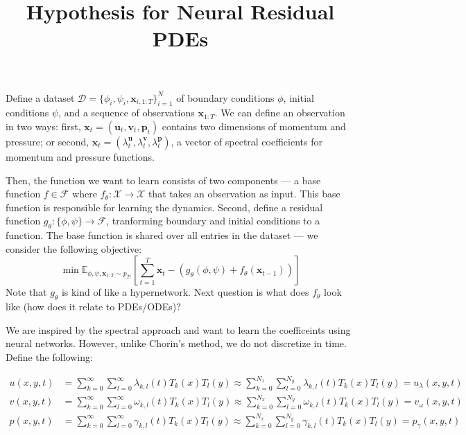 \documentclass[12pt]{article}
\begin{document}
\title{Hypothesis for Neural Residual PDEs}
\maketitle

\noindent Define a dataset $\mathcal{D} = \{ \phi_i, \psi_i, \mathbf{x}_{i, 1:T} \}_{i=1}^N$ of boundary conditions $\phi$, initial conditions $\psi$, and a sequence of observations $\mathbf{x}_{1:T}$. We can define an observation in two ways: first, $\mathbf{x}_t = (\mathbf{u}_t, \mathbf{v}_t, \mathbf{p}_t)$ contains two dimensions of momentum and pressure; or second, $\mathbf{x}_t = (\lambda_t^{\mathbf{u}}, \lambda_t^{\mathbf{v}}, \lambda_t^{\mathbf{p}})$, a vector of spectral coefficients for momentum and pressure functions.\newline

\noindent Then, the function we want to learn consists of two components --- a base function $f \in \mathcal{F}$ where $f_\theta: \mathcal{X} \rightarrow \mathcal{X}$ that takes an observation as input. This base function is responsible for learning the dynamics. Second, define a residual function $g_\theta: \{\phi, \psi\} \rightarrow \mathcal{F}$, tranforming boundary and initial conditions to a function. The base function is shared over all entries in the dataset --- we consider the following objective:
\begin{equation}
    \min \mathbb{E}_{\phi,\psi,\mathbf{x}_{1:T} \sim p_{\mathcal{D}}}\left[ \sum_{t=1}^T \mathbf{x}_t - (g_\theta(\phi,\psi) + f_\theta(\mathbf{x}_{t-1})) \right]
\end{equation}
\noindent Note that $g_\theta$ is kind of like a hypernetwork. Next question is what does $f_\theta$ look like (how does it relate to PDEs/ODEs)?\newline

\noindent We are inspired by the spectral approach and want to learn the coefficeints using neural networks. However, unlike Chorin's method, we do not discretize in time. Define the following:

\begin{align}
    u(x,y,t) &= \sum_{k=0}^\infty\sum_{l=0}^\infty \lambda_{k,l}(t) T_k(x)T_l(y) \approx \sum_{k=0}^{N_x}\sum_{l=0}^{N_y} \lambda_{k,l}(t) T_k(x)T_l(y) = u_\lambda(x,y,t)\\
    v(x,y,t) &= \sum_{k=0}^\infty\sum_{l=0}^\infty \omega_{k,l}(t) T_k(x)T_l(y) \approx \sum_{k=0}^{N_x}\sum_{l=0}^{N_y} \omega_{k,l}(t) T_k(x)T_l(y) = v_\omega(x,y,t)\\
    p(x,y,t) &= \sum_{k=0}^\infty \sum_{l=0}^\infty \gamma_{k,l}(t) T_k(x)T_l(y) \approx \sum_{k=0}^{N_x}\sum_{l=0}^{N_y} \gamma_{k,l}(t) T_k(x)T_l(y) = p_\gamma(x,y,t)
\end{align}
\end{document}
